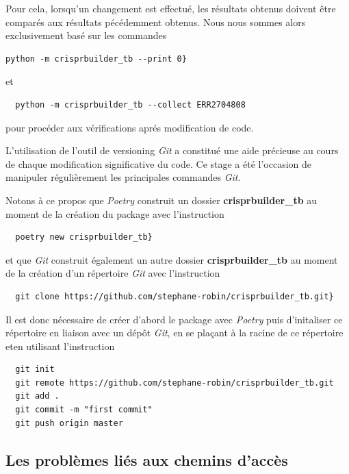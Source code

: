 \documentclass[twoside,a4paper,11pt,frenchb,openany]{report}
\begin{document}
Pour cela, lorsqu'un changement est effectué, les résultats obtenus doivent être comparés aux résultats pécédemment obtenus. Nous nous sommes alors exclusivement basé sur les commandes

\begin{verbatim}python -m crisprbuilder_tb --print 0}\end{verbatim}

et 

\begin{verbatim}  python -m crisprbuilder_tb --collect ERR2704808\end{verbatim}

pour procéder aux vérifications aprés modification de code.

L'utilisation de l'outil de versioning \textit{Git} a constitué une aide précieuse au cours de chaque modification significative du code. Ce stage a été l'occasion de manipuler régulièrement les principales commandes \textit{Git}. 

Notons à ce propos que \textit{Poetry} construit un dossier \textbf{crisprbuilder\_tb} au moment de la création du package avec l'instruction

 \begin{verbatim}  poetry new crisprbuilder_tb}\end{verbatim}

et que \textit{Git} construit également un autre dossier \textbf{crisprbuilder\_tb} au moment de la création d'un répertoire \textit{Git} avec l'instruction

\begin{verbatim}  git clone https://github.com/stephane-robin/crisprbuilder_tb.git}\end{verbatim}

Il est donc nécessaire de créer d'abord le package avec \textit{Poetry} puis d'initaliser ce répertoire en liaison avec un dépôt \textit{Git}, en se plaçant à la racine de ce répertoire eten utilisant l'instruction

\begin{verbatim}
  git init
  git remote https://github.com/stephane-robin/crisprbuilder_tb.git
  git add .
  git commit -m "first commit"
  git push origin master
\end{verbatim} 


\subsection{Les problèmes liés aux chemins d'accès}
\end{document}
